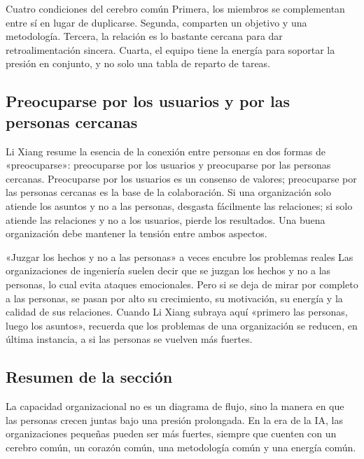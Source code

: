 \begin{importantbox}{Cuatro condiciones del cerebro común}
Primera, los miembros se complementan entre sí en lugar de duplicarse. Segunda, comparten un objetivo y una metodología. Tercera, la relación es lo bastante cercana para dar retroalimentación sincera. Cuarta, el equipo tiene la energía para soportar la presión en conjunto, y no solo una tabla de reparto de tareas.
\end{importantbox}

\subsection{Preocuparse por los usuarios y por las personas cercanas}

Li Xiang resume la esencia de la conexión entre personas en dos formas de «preocuparse»: preocuparse por los usuarios y preocuparse por las personas cercanas. Preocuparse por los usuarios es un consenso de valores; preocuparse por las personas cercanas es la base de la colaboración. Si una organización solo atiende los asuntos y no a las personas, desgasta fácilmente las relaciones; si solo atiende las relaciones y no a los usuarios, pierde los resultados. Una buena organización debe mantener la tensión entre ambos aspectos.

\begin{warningbox}{«Juzgar los hechos y no a las personas» a veces encubre los problemas reales}
Las organizaciones de ingeniería suelen decir que se juzgan los hechos y no a las personas, lo cual evita ataques emocionales. Pero si se deja de mirar por completo a las personas, se pasan por alto su crecimiento, su motivación, su energía y la calidad de sus relaciones. Cuando Li Xiang subraya aquí «primero las personas, luego los asuntos», recuerda que los problemas de una organización se reducen, en última instancia, a si las personas se vuelven más fuertes.
\end{warningbox}

\subsection{Resumen de la sección}

La capacidad organizacional no es un diagrama de flujo, sino la manera en que las personas crecen juntas bajo una presión prolongada. En la era de la IA, las organizaciones pequeñas pueden ser más fuertes, siempre que cuenten con un cerebro común, un corazón común, una metodología común y una energía común.
